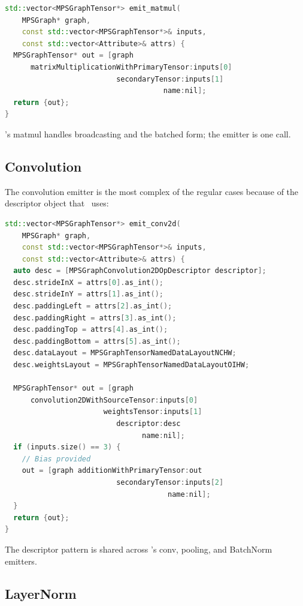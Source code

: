 \begin{lstlisting}[style=lucidcpp,language=C++]
std::vector<MPSGraphTensor*> emit_matmul(
    MPSGraph* graph,
    const std::vector<MPSGraphTensor*>& inputs,
    const std::vector<Attribute>& attrs) {
  MPSGraphTensor* out = [graph
      matrixMultiplicationWithPrimaryTensor:inputs[0]
                          secondaryTensor:inputs[1]
                                     name:nil];
  return {out};
}
\end{lstlisting}

\MPSGraph's matmul handles broadcasting and the batched form;
the emitter is one call.

\subsection{Convolution}
\label{ssec:op_emitters:convolution}

The convolution emitter is the most complex of the regular cases
because of the descriptor object that \MPSGraph\ uses:

\begin{lstlisting}[style=lucidcpp,language=C++]
std::vector<MPSGraphTensor*> emit_conv2d(
    MPSGraph* graph,
    const std::vector<MPSGraphTensor*>& inputs,
    const std::vector<Attribute>& attrs) {
  auto desc = [MPSGraphConvolution2DOpDescriptor descriptor];
  desc.strideInX = attrs[0].as_int();
  desc.strideInY = attrs[1].as_int();
  desc.paddingLeft = attrs[2].as_int();
  desc.paddingRight = attrs[3].as_int();
  desc.paddingTop = attrs[4].as_int();
  desc.paddingBottom = attrs[5].as_int();
  desc.dataLayout = MPSGraphTensorNamedDataLayoutNCHW;
  desc.weightsLayout = MPSGraphTensorNamedDataLayoutOIHW;

  MPSGraphTensor* out = [graph
      convolution2DWithSourceTensor:inputs[0]
                       weightsTensor:inputs[1]
                          descriptor:desc
                                name:nil];
  if (inputs.size() == 3) {
    // Bias provided
    out = [graph additionWithPrimaryTensor:out
                          secondaryTensor:inputs[2]
                                      name:nil];
  }
  return {out};
}
\end{lstlisting}

The descriptor pattern is shared across \MPSGraph's conv,
pooling, and BatchNorm emitters.

\subsection{LayerNorm}
\label{ssec:op_emitters:layernorm}

